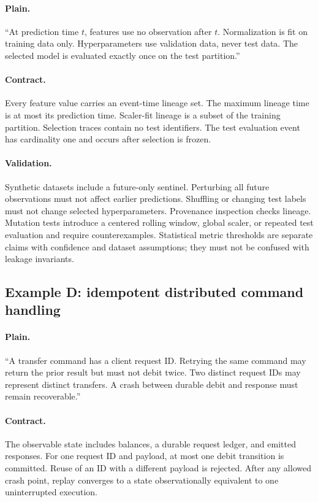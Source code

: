 \documentclass[10pt]{article}
\begin{document}
\paragraph{Plain.}
``At prediction time $t$, features use no observation after $t$.  Normalization
is fit on training data only.  Hyperparameters use validation data, never test
data.  The selected model is evaluated exactly once on the test partition.''

\paragraph{Contract.}
Every feature value carries an event-time lineage set.  The maximum lineage
time is at most its prediction time.  Scaler-fit lineage is a subset of the
training partition.  Selection traces contain no test identifiers.  The test
evaluation event has cardinality one and occurs after selection is frozen.

\paragraph{Validation.}
Synthetic datasets include a future-only sentinel.  Perturbing all future
observations must not affect earlier predictions.  Shuffling or changing test
labels must not change selected hyperparameters.  Provenance inspection checks
lineage.  Mutation tests introduce a centered rolling window, global scaler,
or repeated test evaluation and require counterexamples.  Statistical metric
thresholds are separate claims with confidence and dataset assumptions; they
must not be confused with leakage invariants.

\subsection{Example D: idempotent distributed command handling}

\paragraph{Plain.}
``A transfer command has a client request ID.  Retrying the same command may
return the prior result but must not debit twice.  Two distinct request IDs may
represent distinct transfers.  A crash between durable debit and response must
remain recoverable.''

\paragraph{Contract.}
The observable state includes balances, a durable request ledger, and emitted
responses.  For one request ID and payload, at most one debit transition is
committed.  Reuse of an ID with a different payload is rejected.  After any
allowed crash point, replay converges to a state observationally equivalent to
one uninterrupted execution.
\end{document}
